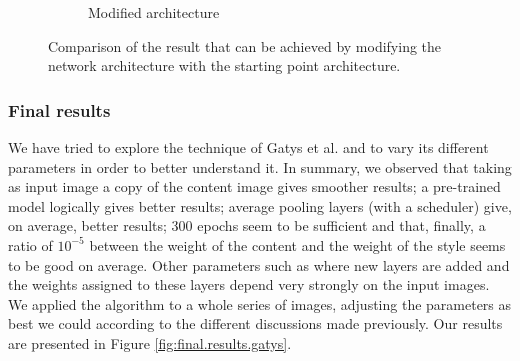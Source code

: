\documentclass[twocolumn,superscriptaddress,aps, floatfix]{revtex4-1}
\begin{document}
\begin{figure}[ht]
\begin{subfigure}[b]{0.22\textwidth}
            \caption{Modified architecture}
            \label{fig:added.layer.result}
        \end{subfigure}
        \caption{Comparison of the result that can be achieved by modifying the network architecture with the starting point architecture.}
    \end{figure}
    
    \subsubsection{Final results}
    
    We have tried to explore the technique of Gatys et al. and to vary its different parameters in order to better understand it. In summary, we observed that taking as input image a copy of the content image gives smoother results; a pre-trained model logically gives better results; average pooling layers (with a scheduler) give, on average, better results; 300 epochs seem to be sufficient and that, finally, a ratio of $10^{-5}$ between the weight of the content and the weight of the style seems to be good on average. Other parameters such as where new layers are added and the weights assigned to these layers depend very strongly on the input images.\\
    
    We applied the algorithm to a whole series of images, adjusting the parameters as best we could according to the different discussions made previously. Our results are presented in Figure \ref{fig:final.results.gatys}.
    
\end{document}
